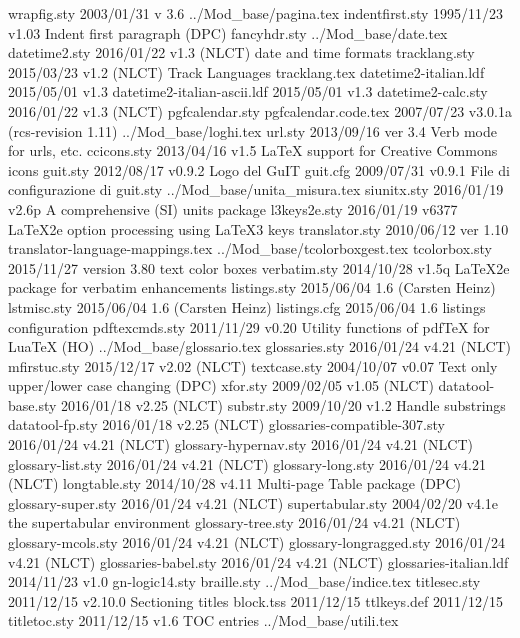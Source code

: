  wrapfig.sty    2003/01/31  v 3.6
../Mod_base/pagina.tex
indentfirst.sty    1995/11/23 v1.03 Indent first paragraph (DPC)
fancyhdr.sty    
../Mod_base/date.tex
datetime2.sty    2016/01/22 v1.3 (NLCT) date and time formats
tracklang.sty    2015/03/23 v1.2 (NLCT) Track Languages
tracklang.tex
datetime2-italian.ldf    2015/05/01 v1.3
datetime2-italian-ascii.ldf    2015/05/01 v1.3
datetime2-calc.sty    2016/01/22 v1.3 (NLCT)
pgfcalendar.sty    
pgfcalendar.code.tex    2007/07/23 v3.0.1a (rcs-revision 1.11)
../Mod_base/loghi.tex
     url.sty    2013/09/16  ver 3.4  Verb mode for urls, etc.
 ccicons.sty    2013/04/16 v1.5 LaTeX support for Creative Commons icons
    guit.sty    2012/08/17 v0.9.2 Logo del GuIT
    guit.cfg    2009/07/31 v0.9.1 File di configurazione di guit.sty
../Mod_base/unita_misura.tex
 siunitx.sty    2016/01/19 v2.6p A comprehensive (SI) units package
l3keys2e.sty    2016/01/19 v6377 LaTeX2e option processing using LaTeX3 keys
translator.sty    2010/06/12 ver 1.10
translator-language-mappings.tex
../Mod_base/tcolorboxgest.tex
tcolorbox.sty    2015/11/27 version 3.80 text color boxes
verbatim.sty    2014/10/28 v1.5q LaTeX2e package for verbatim enhancements
listings.sty    2015/06/04 1.6 (Carsten Heinz)
 lstmisc.sty    2015/06/04 1.6 (Carsten Heinz)
listings.cfg    2015/06/04 1.6 listings configuration
pdftexcmds.sty    2011/11/29 v0.20 Utility functions of pdfTeX for LuaTeX (HO)
../Mod_base/glossario.tex
glossaries.sty    2016/01/24 v4.21 (NLCT)
mfirstuc.sty    2015/12/17 v2.02 (NLCT)
textcase.sty    2004/10/07 v0.07 Text only upper/lower case changing (DPC)
    xfor.sty    2009/02/05 v1.05 (NLCT)
datatool-base.sty    2016/01/18 v2.25 (NLCT)
  substr.sty    2009/10/20 v1.2 Handle substrings
datatool-fp.sty    2016/01/18 v2.25 (NLCT)
glossaries-compatible-307.sty    2016/01/24 v4.21 (NLCT)
glossary-hypernav.sty    2016/01/24 v4.21 (NLCT)
glossary-list.sty    2016/01/24 v4.21 (NLCT)
glossary-long.sty    2016/01/24 v4.21 (NLCT)
longtable.sty    2014/10/28 v4.11 Multi-page Table package (DPC)
glossary-super.sty    2016/01/24 v4.21 (NLCT)
supertabular.sty    2004/02/20 v4.1e the supertabular environment
glossary-tree.sty    2016/01/24 v4.21 (NLCT)
glossary-mcols.sty    2016/01/24 v4.21 (NLCT)
glossary-longragged.sty    2016/01/24 v4.21 (NLCT)
glossaries-babel.sty    2016/01/24 v4.21 (NLCT)
glossaries-italian.ldf    2014/11/23 v1.0
gn-logic14.sty    
 braille.sty    
../Mod_base/indice.tex
titlesec.sty    2011/12/15 v2.10.0 Sectioning titles
   block.tss    2011/12/15
 ttlkeys.def    2011/12/15
titletoc.sty    2011/12/15 v1.6 TOC entries
../Mod_base/utili.tex
